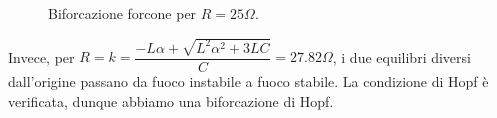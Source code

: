\documentclass[11pt, a4paper]{article}
\begin{document}
\begin{enumerate}
\begin{figure}
\begin{center}
\vfill
{}
\caption{Biforcazione forcone per $R=25 \Omega$.}
\label{fig:forcone}
\end{center}
\end{figure}

Invece, per $R=k=\dfrac{-L\alpha + \sqrt{L^2\alpha^2+3LC}}{C} = 27.82 \Omega$, i due equilibri diversi dall'origine passano da fuoco instabile a fuoco stabile. La condizione di Hopf è verificata, dunque abbiamo una biforcazione di Hopf.


\end{enumerate}
\end{document}
